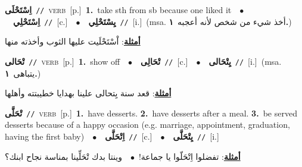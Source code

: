 \documentclass[10pt,a4paper,twoside]{article} %
\begin{document}
\begin{multicols}{2}
{\setlength\topsep{0pt}\textbf{\foreignlanguage{arabic}{اِسْتَحْلَى}}\ {\color{gray}\texttt{//}\color{black}}\ \textsc{verb}\ [p.]\ \textbf{1.}~take sth from sb because one liked it\ \ $\bullet$\ \ \setlength\topsep{0pt}\textbf{\foreignlanguage{arabic}{اِسْتَحْلِي}}\ {\color{gray}\texttt{//}\color{black}}\ [c.]\ \ $\bullet$\ \ \setlength\topsep{0pt}\textbf{\foreignlanguage{arabic}{يِسْتَحْلِي}}\ {\color{gray}\texttt{//}\color{black}}\ [i.]\ \color{gray}(msa. \foreignlanguage{arabic}{أخذ شيء من شخص لأنه أعجبه}~\foreignlanguage{arabic}{\textbf{١.}})\color{black}\  \begin{flushright}\color{gray}\foreignlanguage{arabic}{\textbf{\underline{\foreignlanguage{arabic}{أمثلة}}}: اْسْتَحْلَيت عليها الثوب وأخذته منها}\end{flushright}\color{black}} \vspace{2mm}

{\setlength\topsep{0pt}\textbf{\foreignlanguage{arabic}{تْحَالى}}\ {\color{gray}\texttt{//}\color{black}}\ \textsc{verb}\ [p.]\ \textbf{1.}~show off\ \ $\bullet$\ \ \setlength\topsep{0pt}\textbf{\foreignlanguage{arabic}{تْحَالِى}}\ {\color{gray}\texttt{//}\color{black}}\ [c.]\ \ $\bullet$\ \ \setlength\topsep{0pt}\textbf{\foreignlanguage{arabic}{يِتْحَالى}}\ {\color{gray}\texttt{//}\color{black}}\ [i.]\ \color{gray}(msa. \foreignlanguage{arabic}{يتباهى}~\foreignlanguage{arabic}{\textbf{١.}})\color{black}\  \begin{flushright}\color{gray}\foreignlanguage{arabic}{\textbf{\underline{\foreignlanguage{arabic}{أمثلة}}}: قعد سنة يِتحالى علينا بهدايا خطيبتته وأهلها}\end{flushright}\color{black}} \vspace{2mm}

{\setlength\topsep{0pt}\textbf{\foreignlanguage{arabic}{تْحَلَّى}}\ {\color{gray}\texttt{//}\color{black}}\ \textsc{verb}\ [p.]\ \textbf{1.}~have desserts.  \textbf{2.}~have desserts after a meal.  \textbf{3.}~be served desserts because of a happy occasion (e.g. marriage, appointment, graduation, having the first baby)\ \ $\bullet$\ \ \setlength\topsep{0pt}\textbf{\foreignlanguage{arabic}{اِتْحَلَّى}}\ {\color{gray}\texttt{//}\color{black}}\ [c.]\ \ $\bullet$\ \ \setlength\topsep{0pt}\textbf{\foreignlanguage{arabic}{يِتْحَلَّى}}\ {\color{gray}\texttt{//}\color{black}}\ [i.]\  \begin{flushright}\color{gray}\foreignlanguage{arabic}{\textbf{\underline{\foreignlanguage{arabic}{أمثلة}}}: تفضلوا اِتْحَلّوا يا جماعة!\ $\bullet$\ \  وينتا بدك تْحَلِّينا بمناسة نجاح ابنك؟}\end{flushright}\color{black}} \vspace{2mm}


\end{multicols}
\end{document}
